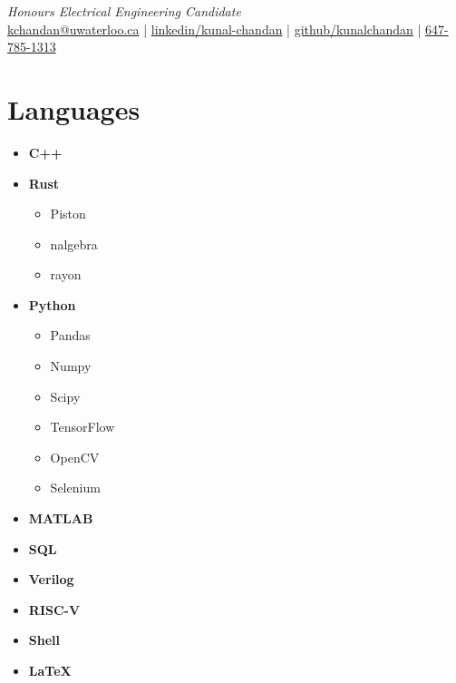 \documentclass[]{chandan-cv}
\begin{document}
%
%

%
%
{
	\textit{Honours Electrical Engineering Candidate} \\
	\href{mailto:kchandan@uwaterloo.ca}{kchandan@uwaterloo.ca} \quad
	| \quad
	\href{https://www.linkedin.com/in/kunal-chandan/}{linkedin/kunal-chandan} \quad
	| \quad
	\href{http://github.com/kunalchandan}{github/kunalchandan} \quad
	| \quad
	\href{tel:6477851313}{647-785-1313}
}

%
%

\begin{minipage}[t]{0.23\textwidth}


\section{Languages}
	\begin{itemize}
		\setlength\itemsep{-0.2em}
		\item \textbf{C++}
		\item \textbf{Rust}
				\begin{itemize}
						\setlength\itemsep{-0.17em}
						\item Piston
						\item nalgebra
						\item rayon
				\end{itemize}
		\item \textbf{Python}
			\begin{itemize}
				\setlength\itemsep{-0.17em}
				\item Pandas
				\item Numpy
				\item Scipy
				\item TensorFlow
				\item OpenCV
				\item Selenium
			\end{itemize}
		\item \textbf{MATLAB}
		\item \textbf{SQL}
		\item \textbf{Verilog}
		\item \textbf{RISC-V}
		\item \textbf{Shell}
		\item \textbf{LaTeX}
	\end{itemize}


\end{minipage}
\end{document}
